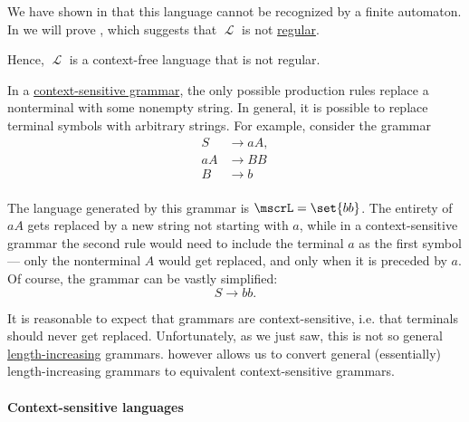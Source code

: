 \begin{example}
\begin{thmenum}
    We have shown in  that this language cannot be recognized by a finite automaton. In  we will prove , which suggests that \( \mscrL \) is not \hyperref[def:chomsky_hierarchy/regular]{regular}.

    Hence, \( \mscrL \) is a context-free language that is not regular.

     In a \hyperref[def:chomsky_hierarchy/context_sensitive]{context-sensitive grammar}, the only possible production rules replace a nonterminal with some nonempty string. In general, it is possible to replace terminal symbols with arbitrary strings. For example, consider the grammar
    \begin{equation*}
      \begin{aligned}
         S &\to aA, \\
        aA &\to BB \\
         B &\to b \\
      \end{aligned}
    \end{equation*}

    The language generated by this grammar is \( \mscrL = \set{ bb } \). The entirety of \( aA \) gets replaced by a new string not starting with \( a \), while in a context-sensitive grammar the second rule would need to include the terminal \( a \) as the first symbol --- only the nonterminal \( A \) would get replaced, and only when it is preceded by \( a \). Of course, the grammar can be vastly simplified:
    \begin{equation*}
      S \to bb.
    \end{equation*}

    It is reasonable to expect that grammars are context-sensitive, i.e. that terminals should never get replaced. Unfortunately, as we just saw, this is not so general \hyperref[def:length_increasing_grammar]{length-increasing} grammars.  however allows us to convert general (essentially) length-increasing grammars to equivalent context-sensitive grammars.
  \end{thmenum}
\end{example}

\paragraph{Context-sensitive languages}

